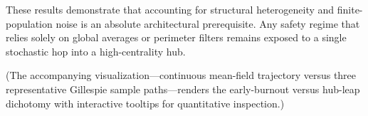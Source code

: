 These results demonstrate that accounting for structural heterogeneity and finite-population noise is an absolute architectural prerequisite. Any safety regime that relies solely on global averages or perimeter filters remains exposed to a single stochastic hop into a high-centrality hub.

(The accompanying visualization—continuous mean-field trajectory versus three representative Gillespie sample paths—renders the early-burnout versus hub-leap dichotomy with interactive tooltips for quantitative inspection.)
